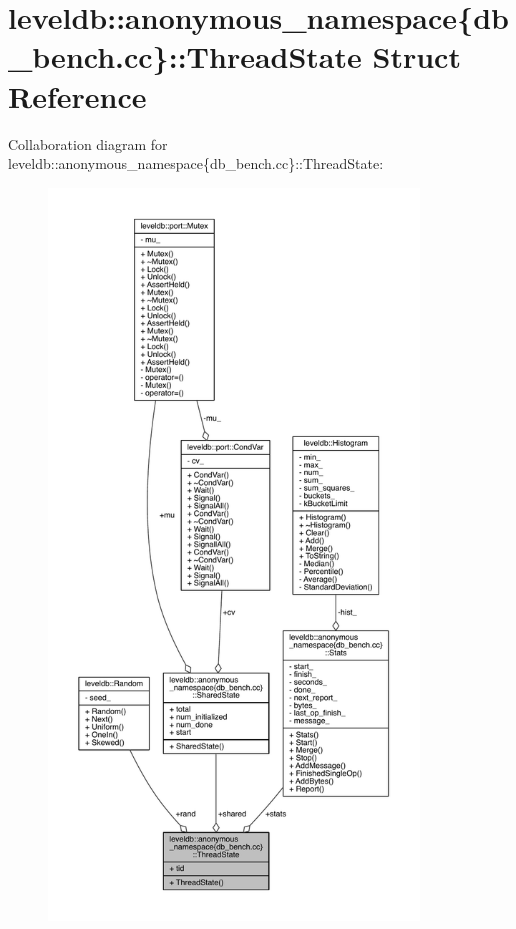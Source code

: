 \hypertarget{structleveldb_1_1anonymous__namespace_02db__bench_8cc_03_1_1_thread_state}{}\section{leveldb\+:\+:anonymous\+\_\+namespace\{db\+\_\+bench.\+cc\}\+:\+:Thread\+State Struct Reference}
\label{structleveldb_1_1anonymous__namespace_02db__bench_8cc_03_1_1_thread_state}


Collaboration diagram for leveldb\+:\+:anonymous\+\_\+namespace\{db\+\_\+bench.\+cc\}\+:\+:Thread\+State\+:
\nopagebreak
\begin{figure}[H]
\begin{center}
\leavevmode
\includegraphics[height=550pt]{structleveldb_1_1anonymous__namespace_02db__bench_8cc_03_1_1_thread_state__coll__graph}
\end{center}
\end{figure}
